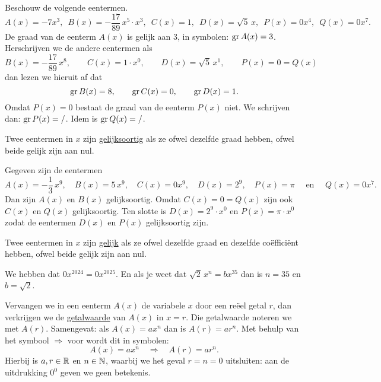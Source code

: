 \documentclass{ximera}
\begin{document}
\begin{example}
Beschouw de volgende eentermen.
\[
A(x) = -7x^3, \,\,\, B(x) = -\frac{17}{89}\,x^5\cdot x^3, \,\,\, C(x) = 1, \,\,\, D(x) = \sqrt{5}\,x, \,\,\, P(x) = 0 x^4, \,\,\,  Q(x) = 0 x^7.
\]
De graad van de eenterm \( A(x) \) is gelijk aan \( 3 \), in symbolen: \( \operatorname{gr} A(x) = 3 \). Herschrijven we de andere eentermen als
\[
B(x) = -\frac{17}{89}\,x^8, \qquad C(x) = 1\cdot x^0, \qquad D(x) = \sqrt{5}\,x^1, \qquad P(x) = 0 = Q(x)
\]
dan lezen we hieruit af dat 
\[
\operatorname{gr} B(x) = 8, \qquad \operatorname{gr} C(x) = 0, \qquad \operatorname{gr} D(x) = 1. 
\]
Omdat \( P(x) = 0 \) bestaat de graad van de eenterm \( P(x) \) niet. We schrijven dan: \( \operatorname{gr} P(x) = / \). Idem is \( \operatorname{gr} Q(x) = / \).
\end{example}

Twee eentermen in \( x \) zijn \underline{gelijksoortig} als ze ofwel dezelfde graad hebben, ofwel beide gelijk zijn aan nul.

\begin{example}
Gegeven zijn de eentermen
\[
A(x) = -\frac{1}{3}\,x^9, \quad B(x) = 5\,x^9, \quad C(x) = 0x^9, \quad D(x) = 2^9, \quad P(x) = \pi \quad \text{ en } \quad Q(x) = 0 x^7.
\]
Dan zijn \( A(x) \) en \( B(x) \) gelijksoortig. Omdat \( C(x) = 0 = Q(x) \) zijn ook \( C(x) \) en \( Q(x) \) gelijksoortig. Ten slotte is \( D(x) = 2^9 \cdot x^0 \) en \( P(x) = \pi \cdot x^0 \) zodat de eentermen \( D(x) \) en \( P(x) \) gelijksoortig zijn.  
\end{example}

Twee eentermen in \( x \) zijn \underline{gelijk} als ze ofwel dezelfde graad en dezelfde co\"effici\"ent hebben, ofwel beide gelijk zijn aan nul.

\begin{example}
We hebben dat \( 0x^{2024} = 0x^{2025} \). En als je weet dat \( \sqrt{2}\,x^n = bx^{35} \) dan is \( n = 35 \) en \( b = \sqrt{2} \).
\end{example}



Vervangen we in een eenterm \( A(x) \) de variabele \( x \) door een re\"eel getal \( r \), dan verkrijgen we de \underline{getalwaarde} van \( A(x) \) in \( x = r \). Die getalwaarde noteren we met \( A(r) \). Samengevat: als \( A(x) = ax^n \) dan is \( A(r) = ar^n \). Met behulp van het symbool \( \Rightarrow \) voor  wordt dit in symbolen:
\[
A(x) = ax^n \quad \Rightarrow \quad A(r) = a r^n.
\]
Hierbij is \( a,r \in \mathbb{R} \) en \( n \in \mathbb{N} \), waarbij we het geval \( r = n = 0 \) uitsluiten: aan de uitdrukking \( 0^0 \) geven we geen betekenis.
\end{document}
